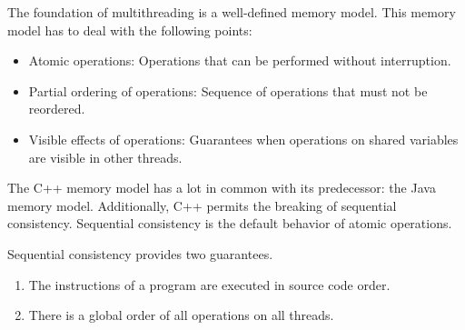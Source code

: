 The foundation of multithreading is a well-defined memory model. This memory model has to deal with the following points:

\begin{itemize}
\item 
Atomic operations: Operations that can be performed without interruption.

\item 
Partial ordering of operations: Sequence of operations that must not be reordered.

\item 
Visible effects of operations: Guarantees when operations on shared variables are visible in other threads.
\end{itemize}

The C++ memory model has a lot in common with its predecessor: the Java memory model.
Additionally, C++ permits the breaking of sequential consistency. Sequential consistency is the default behavior of atomic operations.

Sequential consistency provides two guarantees.

\begin{enumerate}
\item 
The instructions of a program are executed in source code order.

\item 
There is a global order of all operations on all threads.
\end{enumerate}















































